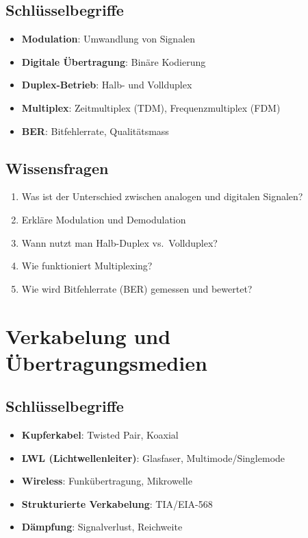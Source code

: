 \documentclass[12pt,a4paper,german]{report}
\begin{document}
\section{Schlüsselbegriffe}
\begin{itemize}
    \item \textbf{Modulation}: Umwandlung von Signalen
    \item \textbf{Digitale Übertragung}: Binäre Kodierung
    \item \textbf{Duplex-Betrieb}: Halb- und Vollduplex
    \item \textbf{Multiplex}: Zeitmultiplex (TDM), Frequenzmultiplex (FDM)
    \item \textbf{BER}: Bitfehlerrate, Qualitätsmass
\end{itemize}

\section{Wissensfragen}
\begin{enumerate}
    \item Was ist der Unterschied zwischen analogen und digitalen Signalen?
    \item Erkläre Modulation und Demodulation
    \item Wann nutzt man Halb-Duplex vs.\ Vollduplex?
    \item Wie funktioniert Multiplexing?
    \item Wie wird Bitfehlerrate (BER) gemessen und bewertet?
\end{enumerate}

\chapter{Verkabelung und Übertragungsmedien}

\section{Schlüsselbegriffe}
\begin{itemize}
    \item \textbf{Kupferkabel}: Twisted Pair, Koaxial
    \item \textbf{LWL (Lichtwellenleiter)}: Glasfaser, Multimode/Singlemode
    \item \textbf{Wireless}: Funkübertragung, Mikrowelle
    \item \textbf{Strukturierte Verkabelung}: TIA/EIA-568
    \item \textbf{Dämpfung}: Signalverlust, Reichweite
\end{itemize}
\end{document}
